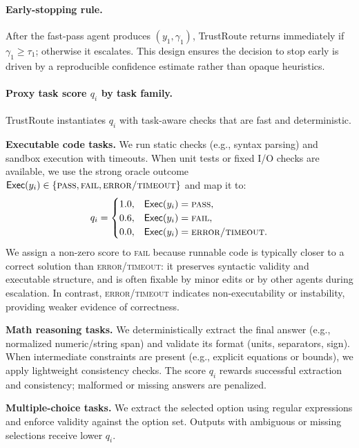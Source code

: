 \documentclass[acmsmall,screen,review,anonymous]{acmart}
\begin{document}
\paragraph{Early-stopping rule.}
After the fast-pass agent produces $(y_1,\gamma_1)$, TrustRoute returns immediately if $\gamma_1 \ge \tau_1$; otherwise it escalates.
This design ensures the decision to stop early is driven by a reproducible confidence estimate rather than opaque heuristics.

\paragraph{Proxy task score $q_i$ by task family.}
TrustRoute instantiates $q_i$ with task-aware checks that are fast and deterministic.

\textbf{Executable code tasks.}
We run static checks (e.g., syntax parsing) and sandbox execution with timeouts.
When unit tests or fixed I/O checks are available, we use the strong oracle outcome
$\mathsf{Exec}(y_i)\in\{\textsc{pass},\textsc{fail},\textsc{error/timeout}\}$ and map it to:
\begin{equation}
q_i=
\begin{cases}
1.0, & \mathsf{Exec}(y_i)=\textsc{pass},\\
0.6, & \mathsf{Exec}(y_i)=\textsc{fail},\\
0.0, & \mathsf{Exec}(y_i)=\textsc{error/timeout}.
\end{cases}
\label{eq:score_exec}
\end{equation}
We assign a non-zero score to \textsc{fail} because runnable code is typically closer to a correct solution than \textsc{error/timeout}: it preserves syntactic validity and executable structure, and is often fixable by minor edits or by other agents during escalation.
In contrast, \textsc{error/timeout} indicates non-executability or instability, providing weaker evidence of correctness.

\textbf{Math reasoning tasks.}
We deterministically extract the final answer (e.g., normalized numeric/string span) and validate its format (units, separators, sign).
When intermediate constraints are present (e.g., explicit equations or bounds), we apply lightweight consistency checks.
The score $q_i$ rewards successful extraction and consistency; malformed or missing answers are penalized.

\textbf{Multiple-choice tasks.}
We extract the selected option using regular expressions and enforce validity against the option set.
Outputs with ambiguous or missing selections receive lower $q_i$.
\end{document}

